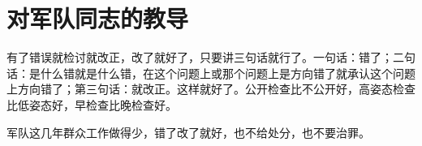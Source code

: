 \section[对军队同志的教导（一九六七年七月）]{对军队同志的教导}


有了错误就检讨就改正，改了就好了，只要讲三句话就行了。一句话：错了；二句话：是什么错就是什么错，在这个问题上或那个问题上是方向错了就承认这个问题上方向错了；第三句话：就改正。这样就好了。公开检查比不公开好，高姿态检查比低姿态好，早检查比晚检查好。


军队这几年群众工作做得少，错了改了就好，也不给处分，也不要治罪。



